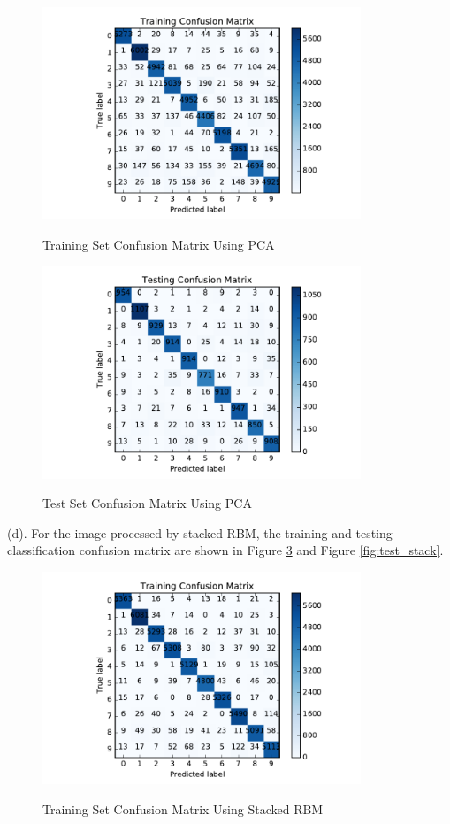 \begin{figure}[H]
\centering
\includegraphics[width=0.85\textwidth]{./figures/train_pca.pdf}\
\caption{\label{fig:train_pca} Training Set Confusion Matrix Using PCA}
\end{figure}

\begin{figure}[H]
\centering
\includegraphics[width=0.85\textwidth]{./figures/test_pca.pdf}\
\caption{\label{fig:test_pca} Test Set Confusion Matrix Using PCA}
\end{figure}

(d). For the image processed by stacked RBM, the training and testing classification confusion matrix are shown in Figure \ref{fig:train_stack} and Figure \ref{fig:test_stack}.

\begin{figure}[H]
\centering
\includegraphics[width=0.85\textwidth]{./figures/train_stacking.pdf}\
\caption{\label{fig:train_stack} Training Set Confusion Matrix Using Stacked RBM}
\end{figure}


